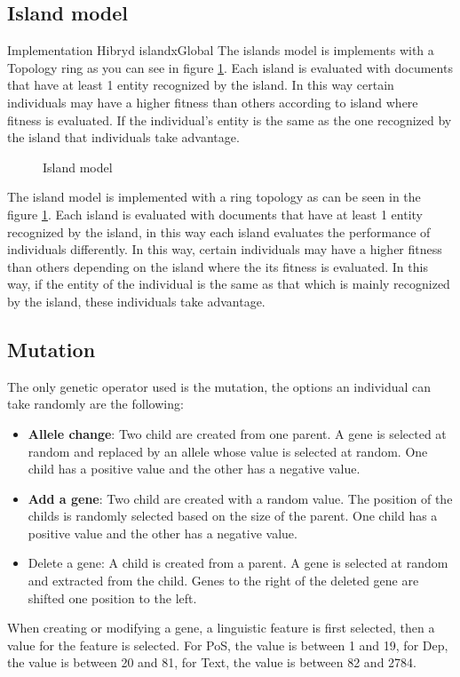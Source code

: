 \documentclass{IEEEtran}
\begin{document}
\subsection{Island model}

Implementation Hibryd islandxGlobal
The islands model is implements with a Topology ring as you can see in figure \ref{fig:island}. Each island is evaluated with documents that have at least 1 entity recognized by the island. In this way certain individuals may have a higher fitness than others according to island where fitness is evaluated. If the individual's entity is the same as the one recognized by the island that individuals take advantage.

\begin{figure}[ht]
  \centering
  
  \caption{Island model}
  \label{fig:island}
\end{figure}

The island model is implemented with a ring topology as can be seen in the figure \ref{fig:island}. Each island is evaluated with documents that have at least 1 entity recognized by the island, in this way each island evaluates the performance of individuals differently. In this way, certain individuals may have a higher fitness than others depending on the island where the its fitness is evaluated. In this way, if the entity of the individual is the same as that which is mainly recognized by the island, these individuals take advantage.

\subsection{Mutation}

The only genetic operator used is the mutation, the options an individual can take randomly are the following:

\begin{itemize}
  \item \textbf{Allele change}: Two child are created from one parent. A gene is selected at random and replaced by an allele whose value is selected at random. One child has a positive value and the other has a negative value.
  \item \textbf{Add a gene}: Two child are created with a random value. The position of the childs is randomly selected based on the size of the parent. One child has a positive value and the other has a negative value.
  \item Delete a gene: A child is created from a parent. A gene is selected at random and extracted from the child. Genes to the right of the deleted gene are shifted one position to the left.
\end{itemize}
When creating or modifying a gene, a linguistic feature is first selected, then a value for the feature is selected. For PoS, the value is between 1 and 19, for Dep, the value is between 20 and 81, for Text, the value is between 82 and 2784.
\end{document}
